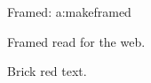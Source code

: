 \documentclass{article}
\begin{document}
Framed: \ownprimframed
\expandafter\ifx\csname a:makeframed\endcsname\relax\else\par Framed read for the web.\fi\par
\textcolor[named]{BrickRed}{Brick red text.}
\end{document}
